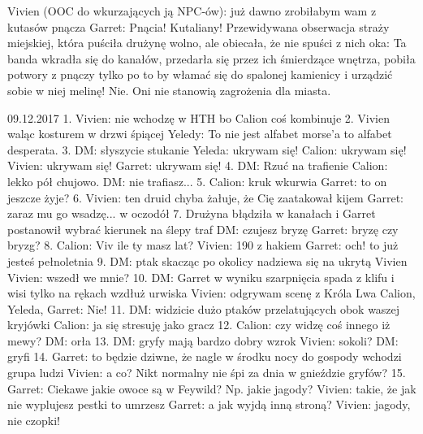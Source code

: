 \documentclass[10pt,twoside,twocolumn]{book}
\begin{document}
%       
Vivien (OOC do wkurzających ją NPC-ów): już dawno zrobiłabym wam z kutasów pnącza
Garret: Pnącia! Kutaliany!
%    
%       
Przewidywana obserwacja straży miejskiej, która puściła drużynę wolno, ale obiecała, że nie spuści z nich oka: Ta banda wkradła się do kanałów, przedarła się przez ich śmierdzące wnętrza, pobiła potwory z pnączy tylko po to by włamać się do spalonej kamienicy i urządzić sobie w niej melinę! Nie. Oni nie stanowią zagrożenia dla miasta.
%    
%       



09.12.2017
1. Vivien: nie wchodzę w HTH bo Calion coś kombinuje
2. Vivien waląc kosturem w drzwi śpiącej Yeledy: To nie jest alfabet morse'a to alfabet desperata.
3. DM: słyszycie stukanie Yeleda: ukrywam się! Calion: ukrywam się! Vivien: ukrywam się! Garret: ukrywam się!
4. DM: Rzuć na trafienie Calion: lekko pół chujowo. DM: nie trafiasz...
5. Calion: kruk wkurwia Garret: to on jeszcze żyje?
6. Vivien: ten druid chyba żałuje, że Cię zaatakował kijem Garret: zaraz mu go wsadzę... w oczodół
7. Drużyna błądziła w kanałach i Garret postanowił wybrać kierunek na ślepy traf DM: czujesz bryzę Garret: bryzę czy bryzg?
8. Calion: Viv ile ty masz lat? Vivien: 190 z hakiem Garret: och! to już jesteś pełnoletnia
9. DM: ptak skacząc po okolicy nadziewa się na ukrytą Vivien Vivien: wszedł we mnie?
10. DM: Garret w wyniku szarpnięcia spada z klifu i wisi tylko na rękach wzdłuż urwiska Vivien: odgrywam scenę z Króla Lwa Calion, Yeleda, Garret: Nie!
11. DM: widzicie dużo ptaków przelatujących obok waszej kryjówki Calion: ja się stresuję jako gracz
12. Calion: czy widzę coś innego iż mewy? DM: orła
13. DM: gryfy mają bardzo dobry wzrok Vivien: sokoli? DM: gryfi
14. Garret: to będzie dziwne, że nagle w środku nocy do gospody wchodzi grupa ludzi Vivien: a co? Nikt normalny nie śpi za dnia w gnieździe gryfów?
15. Garret: Ciekawe jakie owoce są w Feywild? Np. jakie jagody? Vivien: takie, że jak nie wyplujesz pestki to umrzesz Garret: a jak wyjdą inną stroną? Vivien: jagody, nie czopki!
\end{document}
